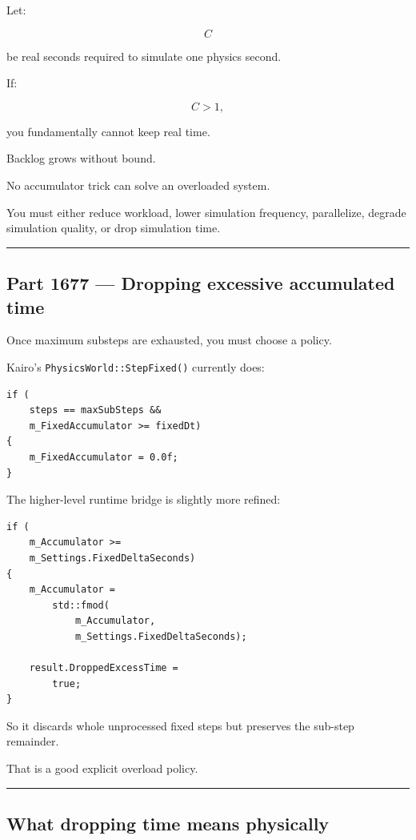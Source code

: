 Let:

\[
C
\]

be real seconds required to simulate one physics second.

If:

\[
C>1,
\]

you fundamentally cannot keep real time.

Backlog grows without bound.

No accumulator trick can solve an overloaded system.

You must either reduce workload, lower simulation frequency, parallelize, degrade simulation quality, or drop simulation time.

\begin{center}\rule{0.5\linewidth}{0.5pt}\end{center}

\subsection{Part 1677 --- Dropping excessive accumulated time}\label{06-engine-ii-ch037-part-1677-dropping-excessive-accumulated-time}

Once maximum substeps are exhausted, you must choose a policy.

Kairo's \texttt{PhysicsWorld::StepFixed()} currently does:

\begin{verbatim}
if (
    steps == maxSubSteps &&
    m_FixedAccumulator >= fixedDt)
{
    m_FixedAccumulator = 0.0f;
}
\end{verbatim}

The higher-level runtime bridge is slightly more refined:

\begin{verbatim}
if (
    m_Accumulator >=
    m_Settings.FixedDeltaSeconds)
{
    m_Accumulator =
        std::fmod(
            m_Accumulator,
            m_Settings.FixedDeltaSeconds);

    result.DroppedExcessTime =
        true;
}
\end{verbatim}

So it discards whole unprocessed fixed steps but preserves the sub-step remainder.

That is a good explicit overload policy.

\begin{center}\rule{0.5\linewidth}{0.5pt}\end{center}

\subsection{What dropping time means physically}\label{06-engine-ii-ch037-what-dropping-time-means-physically}

